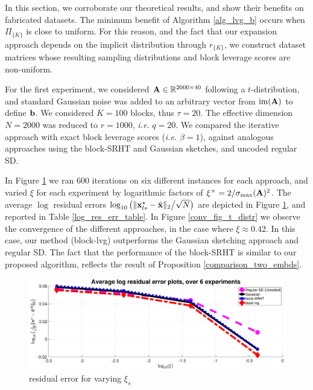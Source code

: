 \documentclass[journal,letterpaper,onecolumn,twoside,nofonttune]{IEEEtran}
\newcommand{\R}{\mathbb{R}}
\newcommand{\bb}{\bold{b}}
\newcommand{\xb}{\bold{x}}
\newcommand{\xbh}{\hat{\xb}}
\newcommand{\Ab}{\bold{A}}
\newcommand{\image}{\mathrm{im}}
\begin{document}
In this section, we corroborate our theoretical results, and show their benefits on fabricated datasets. The minimum benefit of Algorithm \ref{alg_lvg_b} occurs when $\Pi_{\{K\}}$ is close to uniform. For this reason, and the fact that our expansion approach depends on the implicit distribution through $r_{\{K\}}$, we construct dataset matrices whose resulting sampling distributions and block leverage scores are non-uniform.%

For the first experiment, we considered $\Ab\in\R^{2000\times40}$ following a $t$-distribution, and standard Gaussian noise was added to an arbitrary vector from $\image(\Ab)$ to define $\bb$. We considered $K=100$ blocks, thus $\tau=20$. The effective dimension $N=2000$ was reduced to $r=1000$, \textit{i.e.} $q=20$. We compared the iterative approach with exact block leverage scores (\textit{i.e.} $\beta=1$), against analogous approaches using the block-SRHT and Gaussian sketches, and uncoded regular SD.

In Figure \ref{varying_its_t_distr} we ran 600 iterations on six different instances for each approach, and varied $\xi$ for each experiment by logarithmic factors of $\xi^\times=2/\sigma_{\max}(\Ab)^2$. The average $\log$ residual errors $\log_{10}\big(\|\xb_{ls}^{\star}-\xbh\|_2\big/\sqrt{N}\big)$ are depicted in Figure \ref{varying_its_t_distr}, and reported in Table \ref{log_res_err_table}. In Figure \ref{conv_fig_t_distr} we observe the convergence of the different approaches, in the case where $\xi\approx 0.42$. In this case, our method (block-lvg) outperforms the Gaussian sketching approach and regular SD. The fact that the performance of the block-SRHT is similar to our proposed algorithm, reflects the result of Proposition \ref{comparison_two_embds}.

\begin{figure}[h]
  \centering
  \includegraphics[scale=.22]{avg_log_over_six_exp_good-stretch.eps}
  \caption{residual error for varying $\xi_s$}
  \label{varying_its_t_distr}
\end{figure}
\end{document}
